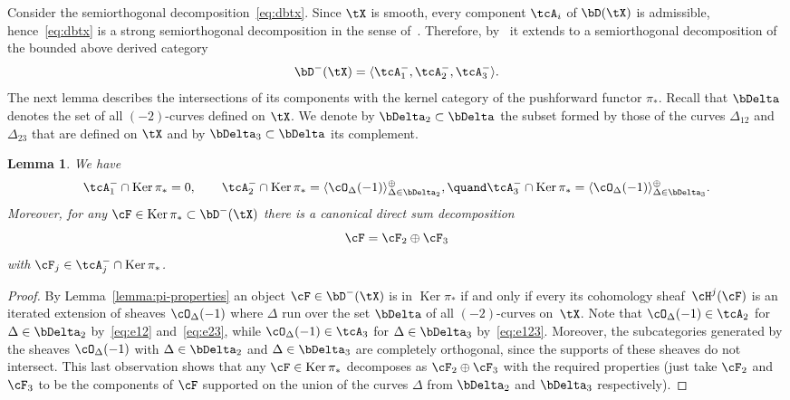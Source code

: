 \documentclass[11pt]{amsart}
\DeclareMathOperator{\Ker}{\mathrm{Ker}}
\theoremstyle{plain}
\newtheorem{lemma}[theorem]{Lemma}
\theoremstyle{definition}
\theoremstyle{remark}
\begin{document}
Consider the semiorthogonal decomposition~\eqref{eq:dbtx}.
Since $\tX$ is smooth, every component $\tcA_i$ of $\bD(\tX)$ is admissible, hence~\eqref{eq:dbtx} is a strong semiorthogonal decomposition 
in the sense of~\cite[Definition~2.6]{kuznetsov2011base}.
Therefore, by~\cite[Proposition~4.2]{kuznetsov2011base} it extends to a semiorthogonal decomposition of the bounded above derived category
\begin{equation}\label{eq:dbtx-}
\bD^-(\tX) = \langle \tcA_1^-, \tcA_2^-, \tcA_3^- \rangle.
\end{equation}
The next lemma describes the intersections of its components with the kernel category of the pushforward functor $\pi_*$.
Recall that $\bDelta$ denotes the set of all $(-2)$-curves defined on $\tX$. 
We denote by $\bDelta_2 \subset \bDelta$ the subset formed by those of the curves $\Delta_{12}$ and $\Delta_{23}$ 
that are defined on $\tX$ and by $\bDelta_3 \subset \bDelta$ its complement.

\begin{lemma}
\label{lemma:ker-pis}
We have 
\begin{equation*}
\tcA_1^- \cap \Ker \pi_* = 0,
\qquad 
\tcA_2^- \cap \Ker \pi_* = \langle \cO_{\Delta}(-1) \rangle^\oplus_{\Delta \in \bDelta_2},
\quand
\tcA_3^- \cap \Ker \pi_* = \langle \cO_{\Delta}(-1) \rangle^\oplus_{\Delta \in \bDelta_3}.
\end{equation*}
Moreover, for any $\cF \in \Ker\pi_* \subset \bD^-(\tX)$ there is a canonical direct sum decomposition 
\begin{equation*}
\cF = \cF_2 \oplus \cF_3
\end{equation*}
with $\cF_j \in \tcA_j^- \cap \Ker \pi_*$.
\end{lemma}
\begin{proof}
By Lemma~\ref{lemma:pi-properties}
an object $\cF \in \bD^-(\tX)$ is in $\Ker\pi_*$ if and only if every its cohomology sheaf~$\cH^j(\cF)$ 
is an iterated extension of sheaves $\cO_\Delta(-1)$
where $\Delta$ run over the set $\bDelta$ of all $(-2)$-curves on~$\tX$.
Note that $\cO_\Delta(-1) \in \tcA_2$ for $\Delta \in \bDelta_2$ by~\eqref{eq:e12} and~\eqref{eq:e23}, while $\cO_\Delta(-1) \in \tcA_3$ for $\Delta \in \bDelta_3$ by~\eqref{eq:e123}.
Moreover, the subcategories generated by the sheaves $\cO_\Delta(-1)$ with $\Delta \in \bDelta_2$ and $\Delta \in \bDelta_3$ are completely orthogonal, since the supports of these sheaves do not intersect.
This last observation shows that any $\cF \in \Ker\pi_*$ decomposes as $\cF_2 \oplus \cF_3$ with the required properties (just take $\cF_2$ and $\cF_3$ to be the components of $\cF$ 
supported on the union of the curves $\Delta$ from $\bDelta_2$ and $\bDelta_3$ respectively).
\end{proof}
\end{document}
